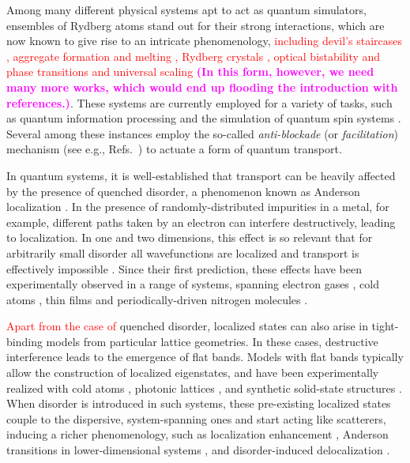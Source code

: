 \documentclass[prl,aps,twocolumn,showpacs,superscriptaddress,longbibliography]{revtex4-1}
\newcommand{\changer}[1]{\textcolor{red}{#1}}
\newcommand{\tochange}[1]{\textcolor{magenta}{#1}}
\newcommand{\mm}[1]{{\tochange{\footnotesize{\bf (#1)}}}}
\begin{document}
Among many different physical systems apt to act as quantum simulators, ensembles of Rydberg atoms \cite{a_Saffman_RMP_10, Low_2012, Gallagher_1994} stand out for their strong interactions, which are now known to give rise to an intricate phenomenology, \changer{including devil's staircases \cite{Weimer2010, Levi2016, Lan2015}, aggregate formation and melting \cite{Schempp2014, Lan2016}, Rydberg crystals \cite{Schauss_2015}, optical bistability \cite{Carr2013, Sibalic2016} and phase transitions and universal scaling \cite{Low2009, Marcuzzi2014, Gutierrez2015}} \mm{In this form, however, we need many more works, which would end up flooding the introduction with references.}. These systems are currently employed for a variety of tasks, such as quantum information processing \cite{Jaksch2000,Weimer_2010,Saffman_2016} and the simulation of quantum spin systems \cite{Labuhn_2015, Schauss_2015}. Several among these instances employ the so-called \emph{anti-blockade} (or \emph{facilitation}) mechanism (see e.g., Refs.~\cite{Ates_2007,Amthor_2010,Garttner_2013,schonleber2014,Lesanovsky_2014,Urvoy_2015,Valado_2016}) to actuate a form of quantum transport.



In quantum systems, it is well-established that transport can be heavily affected by the presence of quenched disorder, a phenomenon known as Anderson localization \cite{Anderson1958}. In the presence of randomly-distributed impurities in a metal, for example, different paths taken by an electron can interfere destructively, leading to localization. In one and two dimensions, this effect is so relevant that for arbitrarily small disorder all wavefunctions are localized and transport is effectively impossible \cite{Mott1961,Ishii1973}. Since their first prediction, these effects have been experimentally observed in a range of systems, spanning electron gases \cite{Cutler:1969}, cold atoms \cite{Billy:2008,Roati:2008,Semeghini:2015}, thin films \cite{Liao:2015} and periodically-driven nitrogen molecules \cite{Bitter:2016}.


\changer{Apart from the case of} quenched disorder, localized states can also arise in tight-binding models from particular lattice geometries. In these cases, destructive interference leads to the emergence of flat bands. Models with flat bands typically allow the construction of localized eigenstates, and have been experimentally realized with cold atoms \cite{Shen2010}, photonic lattices \cite{Mukherjee2015}, and synthetic solid-state structures \cite{slot2017, drost2017}. When disorder is introduced in such systems, these pre-existing localized states couple to the dispersive, system-spanning ones and start acting like scatterers, inducing a richer phenomenology, such as localization enhancement \cite{Leykam2017}, Anderson transitions in lower-dimensional systems \cite{Bodyfelt2014}, and disorder-induced delocalization \cite{Goda2006}.
\end{document}

